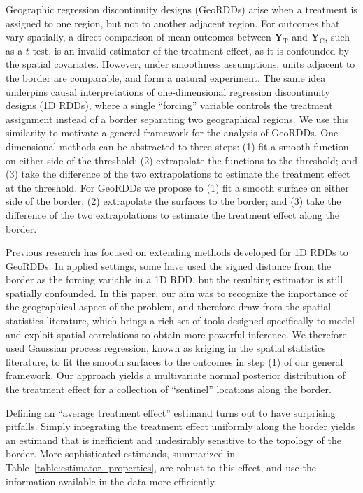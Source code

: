 \documentclass[letter,12pt]{article}
\newcommand{\treat}{\mathrm{T}}
\newcommand{\ctrol}{\mathrm{C}}
\newcommand{\Yvec}{\mathbold{Y}}
\newcommand{\yt}{\Yvec_{\treat}}
\newcommand{\yc}{\Yvec_{\ctrol}}
\begin{document}
Geographic regression discontinuity designs (GeoRDDs) arise when a treatment is assigned to one region, but not to another adjacent region.
For outcomes that vary spatially, a direct comparison of mean outcomes between \(\yt\) and \(\yc\), such as a \(t\)-test, is an invalid estimator of the treatment effect, as it is confounded by the spatial covariates.
However, under smoothness assumptions, units adjacent to the border are comparable, and form a natural experiment.
The same idea underpins causal interpretations of one-dimensional regression discontinuity designs (1D RDDs), where a single ``forcing'' variable controls the treatment assignment instead of a border separating two geographical regions.
We use this similarity to motivate a general framework for the analysis of GeoRDDs.
One-dimensional methods can be abstracted to three steps: (1) fit a smooth function on either side of the threshold; (2) extrapolate the functions to the threshold; and (3) take the difference of the two extrapolations to estimate the treatment effect at the threshold.
For GeoRDDs we propose to (1) fit a smooth surface on either side of the border; (2) extrapolate the surfaces to the border; and (3) take the difference of the two extrapolations to estimate the treatment effect along the border.

Previous research has focused on extending methods developed for 1D RDDs to GeoRDDs.
In applied settings, some have used the signed distance from the border as the forcing variable in a 1D RDD, but the resulting estimator is still spatially confounded.
In this paper, our aim was to recognize the importance of the geographical aspect of the problem, and therefore draw from the spatial statistics literature, which brings a rich set of tools designed specifically to model and exploit spatial correlations to obtain more powerful inference.
We therefore used Gaussian process regression, known as kriging in the spatial statistics literature, to fit the smooth surfaces to the outcomes in step (1) of our general framework.
Our approach yields a multivariate normal posterior distribution of the treatment effect for a collection of ``sentinel'' locations along the border.



Defining an ``average treatment effect'' estimand turns out to have surprising pitfalls.
Simply integrating the treatment effect uniformly along the border yields an estimand that is inefficient and undesirably sensitive to the topology of the border.
More sophisticated estimands, summarized in Table~\ref{table:estimator_properties}, are robust to this effect, and use the information available in the data more efficiently.
\end{document}

